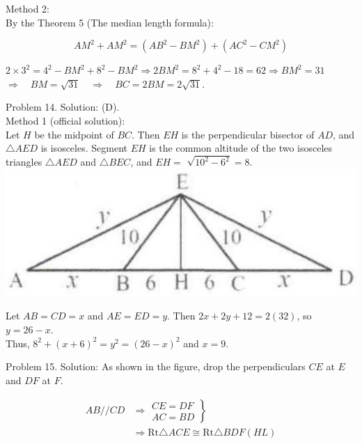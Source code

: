 \documentclass[10pt]{article}
\begin{document}
Method 2:\\
By the Theorem 5 (The median length formula):

\[
A M^{2}+A M^{2}=\left(A B^{2}-B M^{2}\right)+\left(A C^{2}-C M^{2}\right)
\]

\(2 \times 3^{2}=4^{2}-B M^{2}+8^{2}-B M^{2} \Rightarrow 2 B M^{2}=8^{2}+4^{2}-18=62 \Rightarrow B M^{2}=31\) \(\Rightarrow \quad B M=\sqrt{31} \quad \Rightarrow \quad B C=2 B M=2 \sqrt{31}\).

Problem 14. Solution: (D).\\
Method 1 (official solution):\\
Let \(H\) be the midpoint of \(B C\). Then \(E H\) is the perpendicular bisector of \(A D\), and \(\triangle A E D\) is isosceles. Segment \(E H\) is the common altitude of the two isosceles triangles \(\triangle A E D\) and \(\triangle B E C\), and \(E H=\) \(\sqrt{10^{2}-6^{2}}=8\).\\
\includegraphics[max width=\textwidth, center]{2025_04_17_97bc1f7e44d93c271a88g-097(2)}

Let \(A B=C D=x\) and \(A E=E D=y\). Then \(2 x+2 y+12=2(32)\), so \(y=26-x\).\\
Thus, \(8^{2}+(x+6)^{2}=y^{2}=(26-x)^{2}\) and \(x=9\).

Problem 15. Solution:
As shown in the figure, drop the perpendiculars \(C E\) at \(E\) and \(D F\) at \(F\).

\[
\begin{aligned}
A B / / C D & \left.\Rightarrow \begin{array}{l}
C E=D F \\
A C=B D
\end{array}\right\} \\
& \Rightarrow \mathrm{Rt} \triangle A C E \cong \mathrm{Rt} \triangle B D F(H L)
\end{aligned}
\]
\end{document}
